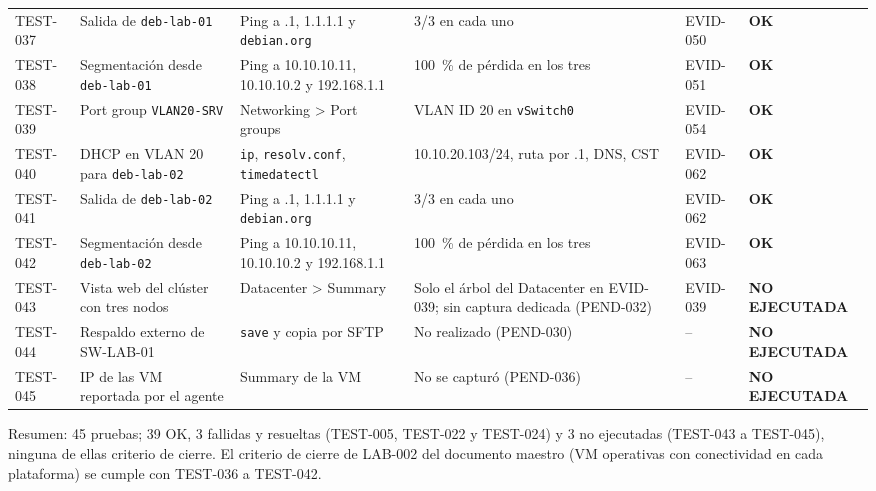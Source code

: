 \documentclass[11pt,a4paper]{article}
\newcommand{\estado}[1]{%
  \ifstrequal{#1}{COMPLETADA}{\textcolor{okgreen}{\textbf{\footnotesize #1}}}{%
  \ifstrequal{#1}{OPERATIVO VALIDADO}{\textcolor{okgreen}{\textbf{\footnotesize #1}}}{%
  \ifstrequal{#1}{OK}{\textcolor{okgreen}{\textbf{\footnotesize #1}}}{%
  \ifstrequal{#1}{RESUELTO}{\textcolor{okgreen}{\textbf{\footnotesize #1}}}{%
  \ifstrequal{#1}{EN CURSO}{\textcolor{amber}{\textbf{\footnotesize #1}}}{%
  \ifstrequal{#1}{REPORTADO}{\textcolor{amber}{\textbf{\footnotesize #1}}}{%
  \ifstrequal{#1}{NO EJECUTADA}{\textcolor{muted}{\textbf{\footnotesize #1}}}{%
  \ifstrequal{#1}{PROPUESTO}{\textcolor{violet}{\textbf{\footnotesize #1}}}{%
  \ifstrequal{#1}{PENDIENTE}{\textcolor{alertred}{\textbf{\footnotesize #1}}}{%
  \ifstrequal{#1}{FALLIDA}{\textcolor{alertred}{\textbf{\footnotesize #1}}}{%
  \textbf{\footnotesize #1}}}}}}}}}}}}
\begin{document}
{\begin{longtable}{L{1.55cm} L{2.7cm} L{3.0cm} L{3.4cm} L{1.55cm} L{2.35cm}}
  TEST-037 & Salida de \texttt{deb-lab-01} & Ping a .1, 1.1.1.1 y \texttt{debian.org} & 3/3 en cada uno & EVID-050 & \estado{OK}\\
  TEST-038 & Segmentación desde \texttt{deb-lab-01} & Ping a 10.10.10.11, 10.10.10.2 y 192.168.1.1 & 100~\% de pérdida en los tres & EVID-051 & \estado{OK}\\
  TEST-039 & Port group \texttt{VLAN20-SRV} & Networking > Port groups & VLAN ID 20 en \texttt{vSwitch0} & EVID-054 & \estado{OK}\\
  TEST-040 & DHCP en VLAN 20 para \texttt{deb-lab-02} & \texttt{ip}, \texttt{resolv.conf}, \texttt{timedatectl} & 10.10.20.103/24, ruta por .1, DNS, CST & EVID-062 & \estado{OK}\\
  TEST-041 & Salida de \texttt{deb-lab-02} & Ping a .1, 1.1.1.1 y \texttt{debian.org} & 3/3 en cada uno & EVID-062 & \estado{OK}\\
  TEST-042 & Segmentación desde \texttt{deb-lab-02} & Ping a 10.10.10.11, 10.10.10.2 y 192.168.1.1 & 100~\% de pérdida en los tres & EVID-063 & \estado{OK}\\
  TEST-043 & Vista web del clúster con tres nodos & Datacenter > Summary & Solo el árbol del Datacenter en EVID-039; sin captura dedicada (PEND-032) & EVID-039 & \estado{NO EJECUTADA}\\
  TEST-044 & Respaldo externo de SW-LAB-01 & \texttt{save} y copia por SFTP & No realizado (PEND-030) & -- & \estado{NO EJECUTADA}\\
  TEST-045 & IP de las VM reportada por el agente & Summary de la VM & No se capturó (PEND-036) & -- & \estado{NO EJECUTADA}\\
  \bottomrule
\end{longtable}
}

Resumen: 45 pruebas; 39 OK, 3 fallidas y resueltas (TEST-005, TEST-022 y TEST-024) y 3 no ejecutadas (TEST-043 a TEST-045), ninguna de ellas criterio de cierre. El criterio de cierre de LAB-002 del documento maestro (VM operativas con conectividad en cada plataforma) se cumple con TEST-036 a TEST-042.

\end{document}
